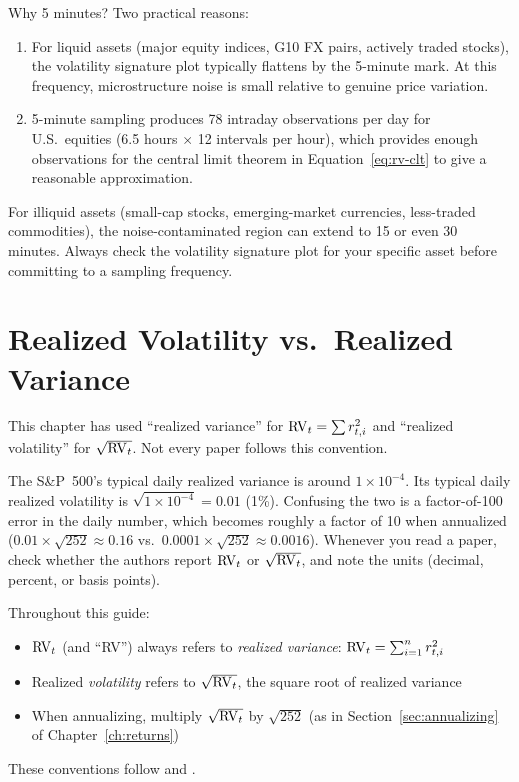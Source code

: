 Why 5 minutes?
Two practical reasons:
\begin{enumerate}[nosep]
  \item For liquid assets (major equity indices, G10 FX pairs, actively traded stocks), the volatility signature plot typically flattens by the 5-minute mark. At this frequency, microstructure noise is small relative to genuine price variation.
  \item 5-minute sampling produces 78 intraday observations per day for U.S.\ equities (6.5 hours $\times$ 12 intervals per hour), which provides enough observations for the central limit theorem in Equation~\eqref{eq:rv-clt} to give a reasonable approximation.
\end{enumerate}

\begin{warning}
For illiquid assets (small-cap stocks, emerging-market currencies, less-traded commodities), the noise-contaminated region can extend to 15 or even 30 minutes.
Always check the volatility signature plot for your specific asset before committing to a sampling frequency.
\end{warning}

\section{Realized Volatility vs.\ Realized Variance}
\label{sec:rv-vs-rvol}

This chapter has used ``realized variance'' for $\operatorname{RV}_t = \sum r^2_{t,i}$ and ``realized volatility'' for $\sqrt{\operatorname{RV}_t}$.
Not every paper follows this convention.

\begin{warning}
The S\&P~500's typical daily realized variance is around $1 \times 10^{-4}$.
Its typical daily realized volatility is $\sqrt{1 \times 10^{-4}} = 0.01$ (1\%).
Confusing the two is a factor-of-100 error in the daily number, which becomes roughly a factor of 10 when annualized ($0.01 \times \sqrt{252} \approx 0.16$ vs.\ $0.0001 \times \sqrt{252} \approx 0.0016$).
Whenever you read a paper, check whether the authors report $\operatorname{RV}_t$ or $\sqrt{\operatorname{RV}_t}$, and note the units (decimal, percent, or basis points).
\end{warning}

\begin{definition}
Throughout this guide:
\begin{itemize}[nosep]
  \item $\operatorname{RV}_t$ (and ``RV'') always refers to \emph{realized variance}: $\operatorname{RV}_t = \sum_{i=1}^{n} r^2_{t,i}$
  \item Realized \emph{volatility} refers to $\sqrt{\operatorname{RV}_t}$, the square root of realized variance
  \item When annualizing, multiply $\sqrt{\operatorname{RV}_t}$ by $\sqrt{252}$ (as in Section~\ref{sec:annualizing} of Chapter~\ref{ch:returns})
\end{itemize}
These conventions follow \citet{ABDL2003} and \citet{BNS2002}.
\end{definition}

